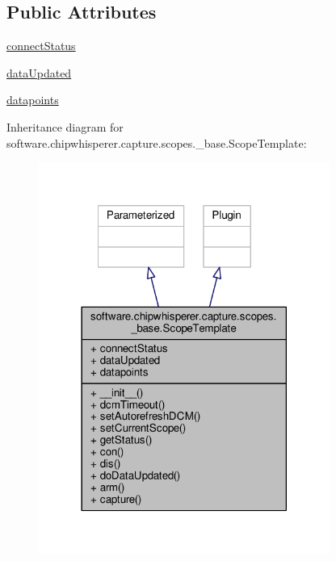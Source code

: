 \subsection*{Public Attributes}
\begin{DoxyCompactItemize}
\item 
\hyperlink{classsoftware_1_1chipwhisperer_1_1capture_1_1scopes_1_1__base_1_1ScopeTemplate_a92f9c738b157c6c69bd663dce1921129}{connect\+Status}
\item 
\hyperlink{classsoftware_1_1chipwhisperer_1_1capture_1_1scopes_1_1__base_1_1ScopeTemplate_a08023f13a2289e2ac5aa4177027ea12f}{data\+Updated}
\item 
\hyperlink{classsoftware_1_1chipwhisperer_1_1capture_1_1scopes_1_1__base_1_1ScopeTemplate_a82148d6b89edf8ca5194cfe85256a972}{datapoints}
\end{DoxyCompactItemize}


Inheritance diagram for software.\+chipwhisperer.\+capture.\+scopes.\+\_\+base.\+Scope\+Template\+:\nopagebreak
\begin{figure}[H]
\begin{center}
\leavevmode
\includegraphics[width=270pt]{da/d32/classsoftware_1_1chipwhisperer_1_1capture_1_1scopes_1_1__base_1_1ScopeTemplate__inherit__graph}
\end{center}
\end{figure}


